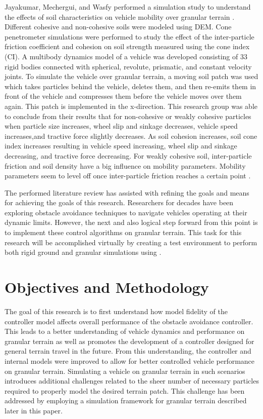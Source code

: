 \documentclass[12pt,onecolumn]{report}
\newcommand{\CHRONO}{{\sffamily{{Chrono}}}}
\begin{document}
Jayakumar, Mechergui, and Wasfy performed a simulation study to understand the effects of soil characteristics on vehicle mobility over granular terrain \cite{SoilCharacteristics2017}. Different cohesive and non-cohesive soils were modeled using DEM. Cone penetrometer simulations were performed to study the effect of the inter-particle friction coefficient and cohesion on soil strength measured using the cone index (CI). A multibody dynamics model of a vehicle was developed consisting of 33 rigid bodies connected with spherical, revolute, prismatic, and constant velocity joints. To simulate the vehicle over granular terrain, a moving soil patch was used which takes particles behind the vehicle, deletes them, and then re-emits them in front of the vehicle and compresses them before the vehicle moves over them again. This patch is implemented in the x-direction. This research group was able to conclude from their results that for non-cohesive or weakly cohesive particles when particle size increases, wheel slip and sinkage decreases, vehicle speed increases,and tractive force slightly decreases. As soil cohesion increases, soil cone index increases resulting in vehicle speed increasing, wheel slip and sinkage decreasing, and tractive force decreasing. For weakly cohesive soil, inter-particle friction and soil density have a big influence on mobility parameters. Mobility parameters seem to level off once inter-particle friction reaches a certain point \cite{SoilCharacteristics2017}.

The performed literature review has assisted with refining the goals and means for achieving the goals of this research. Researchers for decades have been exploring obstacle avoidance techniques to navigate vehicles operating at their dynamic limits. However, the next and also logical step forward from this point is to implement these control algorithms on granular terrain. This task for this research will be accomplished virtually by creating a test environment to perform both rigid ground and granular simulations using {\CHRONO}. 


\section{Objectives and Methodology}\label{s:ObjectivesMethodology}

The goal of this research is to first understand how model fidelity of the controller model affects overall performance of the obstacle avoidance controller. This leads to a better understanding of vehicle dynamics and performance on granular terrain as well as promotes the development of a controller designed for general terrain travel in the future. From this understanding, the controller and internal models were improved to allow for better controlled vehicle performance on granular terrain. Simulating a vehicle on granular terrain in such scenarios introduces additional challenges related to the sheer number of necessary particles required to properly model the desired terrain patch. This challenge has been addressed by employing a simulation framework for granular terrain described later in this paper.
\end{document}
